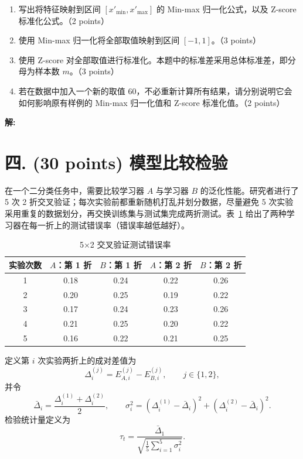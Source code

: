 \documentclass[8pt]{article}
\begin{document}
\begin{enumerate}[leftmargin=2.2em,itemsep=0.55em]
  \item 写出将特征映射到区间 $[x'_{\min},x'_{\max}]$ 的 Min-max 归一化公式，以及 Z-score 标准化公式。（2 points）
  \item 使用 Min-max 归一化将全部取值映射到区间 $[-1,1]$。（3 points）
  \item 使用 Z-score 对全部取值进行标准化。本题中的标准差采用总体标准差，即分母为样本数 $m$。（3 points）
  \item 若在数据中加入一个新的取值 60，不必重新计算所有结果，请分别说明它会如何影响原有样例的 Min-max 归一化值和 Z-score 标准化值。（2 points）
\end{enumerate}

\textbf{\large 解:}

\clearpage
\section*{四. (30 points) 模型比较检验}

在一个二分类任务中，需要比较学习器 $A$ 与学习器 $B$ 的泛化性能。研究者进行了 5 次 2 折交叉验证；每次实验前都重新随机打乱并划分数据，尽量避免 5 次实验采用重复的数据划分，再交换训练集与测试集完成两折测试。表~\ref{tab:5x2cv} 给出了两种学习器在每一折上的测试错误率（错误率越低越好）。

\begin{table}[H]
\centering
\begin{tabular}{ccccc}
\toprule
\textbf{实验次数} & $A$：第 1 折 & $B$：第 1 折 & $A$：第 2 折 & $B$：第 2 折 \\
\midrule
1 & 0.18 & 0.24 & 0.22 & 0.26 \\
2 & 0.20 & 0.25 & 0.19 & 0.22 \\
3 & 0.17 & 0.24 & 0.23 & 0.26 \\
4 & 0.21 & 0.25 & 0.20 & 0.22 \\
5 & 0.16 & 0.22 & 0.21 & 0.25 \\
\bottomrule
\end{tabular}
\caption{5×2 交叉验证测试错误率}
\label{tab:5x2cv}
\end{table}
定义第 $i$ 次实验两折上的成对差值为
\[
\Delta_i^{(j)}=E_{A,i}^{(j)}-E_{B,i}^{(j)},\qquad j\in\{1,2\},
\]
并令
\[
\bar{\Delta}_i=\frac{\Delta_i^{(1)}+\Delta_i^{(2)}}{2},\qquad
\sigma_i^2=\left(\Delta_i^{(1)}-\bar{\Delta}_i\right)^2+
\left(\Delta_i^{(2)}-\bar{\Delta}_i\right)^2.
\]
检验统计量定义为
\[
\tau_t=\frac{\bar{\Delta}_1}{\sqrt{\frac{1}{5}\sum_{i=1}^{5}\sigma_i^2}}.
\]
\end{document}
